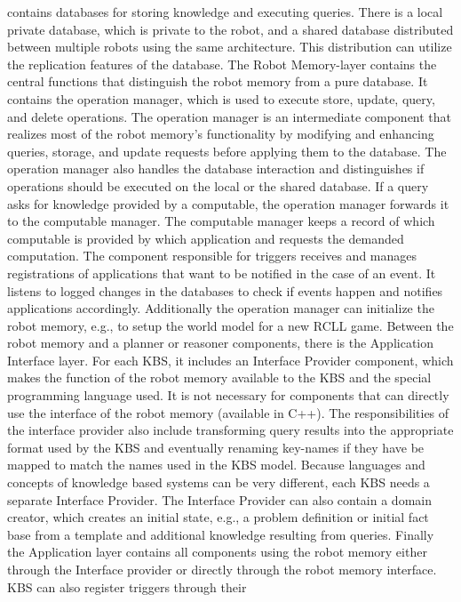 contains databases for storing knowledge and executing queries. There
is a local private database, which is private to the robot, and a
shared database distributed between multiple robots using the same
architecture. This distribution can utilize the replication features
of the database. The Robot Memory-layer contains the central functions
that distinguish the robot memory from a pure database. It contains
the operation manager, which is used to execute store, update, query,
and delete operations. The operation manager is an intermediate
component that realizes most of the robot memory's functionality by
modifying and enhancing queries, storage, and update requests before
applying them to the database. The operation manager also handles the
database interaction and distinguishes if operations should be
executed on the local or the shared database.  If a query asks for
knowledge provided by a computable, the operation manager forwards it
to the computable manager. The computable manager keeps a record of
which computable is provided by which application and requests the
demanded computation. The component responsible for triggers
receives and manages registrations of applications that want to be
notified in the case of an event. It listens to logged changes in the
databases to check if events happen and notifies applications
accordingly. Additionally the operation manager can initialize the
robot memory, e.g., to setup the world model for a new RCLL game.
Between the robot memory and a planner or reasoner components, there
is the Application Interface layer. For each KBS, it includes an
Interface Provider component, which makes the function of the robot
memory available to the KBS and the special programming language
used. It is not necessary for components that can directly use the
interface of the robot memory (available in C++). The responsibilities
of the interface provider also include transforming query results into
the appropriate format used by the KBS and eventually renaming
key-names if they have be mapped to match the names used in the KBS
model. Because languages and concepts of knowledge based systems can
be very different, each KBS needs a separate Interface Provider. The
Interface Provider can also contain a domain creator, which creates an
initial state, e.g., a problem definition or initial fact base from a
template and additional knowledge resulting from queries. Finally the
Application layer contains all components using the robot memory
either through the Interface provider or directly through the robot
memory interface. KBS can also register triggers through their
